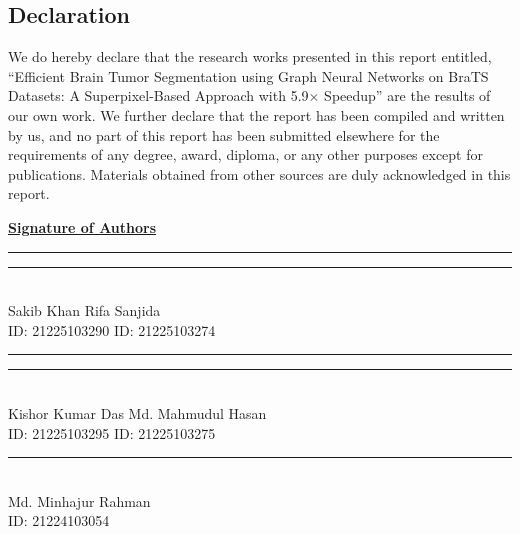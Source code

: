 \documentclass{article}
\begin{document}
\begin{center}
    \section*{Declaration}
\end{center}
\large
We do hereby declare that the research works presented in this report entitled,
``Efficient Brain Tumor Segmentation using Graph Neural Networks on BraTS Datasets:
A Superpixel-Based Approach with 5.9$\times$ Speedup'' are the results of our
own work. We further declare that the report has been compiled and written by us,
and no part of this report has been submitted elsewhere for the requirements of any
degree, award, diploma, or any other purposes except for publications. Materials
obtained from other sources are duly acknowledged in this report.

\vspace{10mm}
\begin{flushleft}
\textbf{\underline{Signature of Authors}}

\vspace{20mm}

\parbox{6cm}{\centering\rule{6cm}{0.4pt}\vspace{2mm}} \null\hfill
\parbox{6cm}{\centering\rule{6cm}{0.4pt}\vspace{2mm}}\\
Sakib Khan \null\hfill Rifa Sanjida \\
ID: 21225103290 \null\hfill ID: 21225103274 \\

\vspace{15mm}

\parbox{6cm}{\centering\rule{6cm}{0.4pt}\vspace{2mm}} \null\hfill
\parbox{6cm}{\centering\rule{6cm}{0.4pt}\vspace{2mm}}\\
Kishor Kumar Das \null\hfill Md. Mahmudul Hasan\\
ID: 21225103295 \null\hfill ID: 21225103275\\

\vspace{15mm}

\parbox{6cm}{\centering\rule{6cm}{0.4pt}\vspace{2mm}}\\
Md. Minhajur Rahman\\
ID: 21224103054 \\
\end{flushleft}
\cleardoublepage
\end{document}
